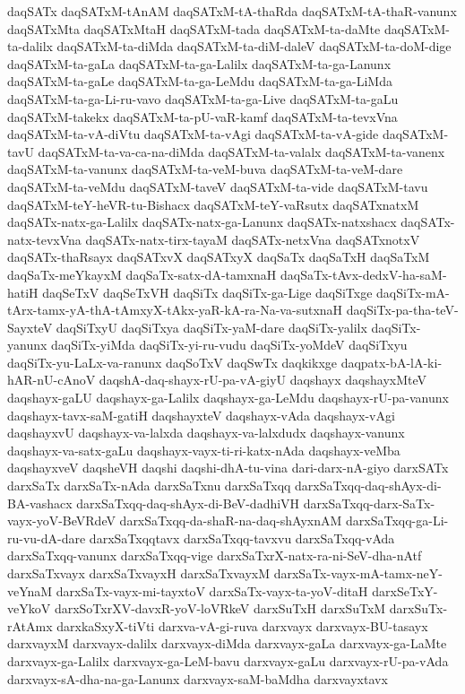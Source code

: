 {daqSATx
daqSATxM-tAnAM
daqSATxM-tA-thaRda
daqSATxM-tA-thaR-vanunx
daqSATxMta
daqSATxMtaH
daqSATxM-tada
daqSATxM-ta-daMte
daqSATxM-ta-dalilx
daqSATxM-ta-diMda
daqSATxM-ta-diM-daleV
daqSATxM-ta-doM-dige
daqSATxM-ta-gaLa
daqSATxM-ta-ga-Lalilx
daqSATxM-ta-ga-Lanunx
daqSATxM-ta-gaLe
daqSATxM-ta-ga-LeMdu
daqSATxM-ta-ga-LiMda
daqSATxM-ta-ga-Li-ru-vavo
daqSATxM-ta-ga-Live
daqSATxM-ta-gaLu
daqSATxM-takekx
daqSATxM-ta-pU-vaR-kamf
daqSATxM-ta-tevxVna
daqSATxM-ta-vA-diVtu
daqSATxM-ta-vAgi
daqSATxM-ta-vA-gide
daqSATxM-tavU
daqSATxM-ta-va-ca-na-diMda
daqSATxM-ta-valalx
daqSATxM-ta-vanenx
daqSATxM-ta-vanunx
daqSATxM-ta-veM-buva
daqSATxM-ta-veM-dare
daqSATxM-ta-veMdu
daqSATxM-taveV
daqSATxM-ta-vide
daqSATxM-tavu
daqSATxM-teY-heVR-tu-Bishacx
daqSATxM-teY-vaRsutx
daqSATxnatxM
daqSATx-natx-ga-Lalilx
daqSATx-natx-ga-Lanunx
daqSATx-natxshacx
daqSATx-natx-tevxVna
daqSATx-natx-tirx-tayaM
daqSATx-netxVna
daqSATxnotxV
daqSATx-thaRsayx
daqSATxvX
daqSATxyX
daqSaTx
daqSaTxH
daqSaTxM
daqSaTx-meYkayxM
daqSaTx-satx-dA-tamxnaH
daqSaTx-tAvx-dedxV-ha-saM-hatiH
daqSeTxV
daqSeTxVH
daqSiTx
daqSiTx-ga-Lige
daqSiTxge
daqSiTx-mA-tArx-tamx-yA-thA-tAmxyX-tAkx-yaR-kA-ra-Na-va-sutxnaH
daqSiTx-pa-tha-teV-SayxteV
daqSiTxyU
daqSiTxya
daqSiTx-yaM-dare
daqSiTx-yalilx
daqSiTx-yanunx
daqSiTx-yiMda
daqSiTx-yi-ru-vudu
daqSiTx-yoMdeV
daqSiTxyu
daqSiTx-yu-LaLx-va-ranunx
daqSoTxV
daqSwTx
daqkikxge
daqpatx-bA-lA-ki-hAR-nU-cAnoV
daqshA-daq-shayx-rU-pa-vA-giyU
daqshayx
daqshayxMteV
daqshayx-gaLU
daqshayx-ga-Lalilx
daqshayx-ga-LeMdu
daqshayx-rU-pa-vanunx
daqshayx-tavx-saM-gatiH
daqshayxteV
daqshayx-vAda
daqshayx-vAgi
daqshayxvU
daqshayx-va-lalxda
daqshayx-va-lalxdudx
daqshayx-vanunx
daqshayx-va-satx-gaLu
daqshayx-vayx-ti-ri-katx-nAda
daqshayx-veMba
daqshayxveV
daqsheVH
daqshi
daqshi-dhA-tu-vina
dari-darx-nA-giyo
darxSATx
darxSaTx
darxSaTx-nAda
darxSaTxnu
darxSaTxqq
darxSaTxqq-daq-shAyx-di-BA-vashacx
darxSaTxqq-daq-shAyx-di-BeV-dadhiVH
darxSaTxqq-darx-SaTx-vayx-yoV-BeVRdeV
darxSaTxqq-da-shaR-na-daq-shAyxnAM
darxSaTxqq-ga-Li-ru-vu-dA-dare
darxSaTxqqtavx
darxSaTxqq-tavxvu
darxSaTxqq-vAda
darxSaTxqq-vanunx
darxSaTxqq-vige
darxSaTxrX-natx-ra-ni-SeV-dha-nAtf
darxSaTxvayx
darxSaTxvayxH
darxSaTxvayxM
darxSaTx-vayx-mA-tamx-neY-veYnaM
darxSaTx-vayx-mi-tayxtoV
darxSaTx-vayx-ta-yoV-ditaH
darxSeTxY-veYkoV
darxSoTxrXV-davxR-yoV-loVRkeV
darxSuTxH
darxSuTxM
darxSuTx-rAtAmx
darxkaSxyX-tiVti
darxva-vA-gi-ruva
darxvayx
darxvayx-BU-tasayx
darxvayxM
darxvayx-dalilx
darxvayx-diMda
darxvayx-gaLa
darxvayx-ga-LaMte
darxvayx-ga-Lalilx
darxvayx-ga-LeM-bavu
darxvayx-gaLu
darxvayx-rU-pa-vAda
darxvayx-sA-dha-na-ga-Lanunx
darxvayx-saM-baMdha
darxvayxtavx
}
